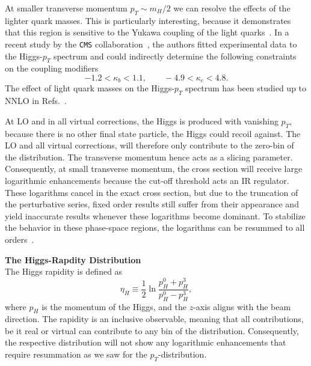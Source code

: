 At smaller transverse momentum $p_T \sim m_H/2$ we can resolve the effects of the lighter quark masses. This is particularly interesting, because it demonstrates that this region is sensitive to the Yukawa coupling of the light quarks~\cite{Bishara:2016jga, Bonner:2016sdg}. In a recent study by the \texttt{CMS} collaboration~\cite{CMS:2018gwt}, the authors fitted experimental data to the Higgs-$p_T$ spectrum and could indirectly determine the following constraints on the coupling modifiers
\begin{equation}
-1.2 < \kappa_b < 1.1, \qquad -4.9 < \kappa_c < 4.8.
\end{equation}
The effect of light quark masses on the Higgs-$p_T$ spectrum has been studied up to \acs{NNLO} in Refs.~\cite{Lindert:2017pky, Caola:2018zye, Bonciani:2022jmb,Czakon:2024ywb}.

At \acs{LO} and in all virtual corrections, the Higgs is produced with vanishing $p_T$, because there is no other final state particle, the Higgs could recoil against. The \acs{LO} and all virtual corrections, will therefore only contribute to the zero-bin of the distribution. The transverse momentum hence acts as a slicing parameter. Consequently, at small transverse momentum, the cross section will receive large logarithmic enhancements because the cut-off threshold acts an \acs{IR} regulator. These logarithms cancel in the exact cross section, but due to the truncation of the perturbative series, fixed order results still suffer from their appearance and yield inaccurate results whenever these logarithms become dominant. To stabilize the behavior in these phase-space regions, the logarithms can be resummed to all orders~\cite{Mantler:2012bj,Grazzini:2013mca, Hamilton:2015nsa, Bagnaschi:2015qta, Bagnaschi:2015bop, Frederix:2016cnl, Caola:2016upw, Niggetiedt:2024nmp}.

\textbf{The Higgs-Rapdity Distribution} \\
The Higgs rapidity is defined as
\begin{equation}
\eta_H \equiv \frac{1}{2} \ln \frac{p^0_H + p^3_H}{p^0_H - p^3_H},
\end{equation}
where $p_H$ is the momentum of the Higgs, and the $z$-axis aligns with the beam direction. The rapidity is an inclusive observable, meaning that all contributions, be it real or virtual can contribute to any bin of the distribution. Consequently, the respective distribution will not show any logarithmic enhancements that require resummation as we saw for the $p_T$-distribution.

